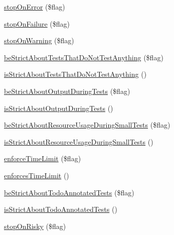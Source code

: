 \begin{DoxyCompactItemize}
\item 
\mbox{\hyperlink{class_p_h_p_unit___framework___test_result_a1c86170306967a8e09ccb686a4b092b7}{stop\+On\+Error}} (\$flag)
\item 
\mbox{\hyperlink{class_p_h_p_unit___framework___test_result_a59807d77af73403915f17d2f2b85a48f}{stop\+On\+Failure}} (\$flag)
\item 
\mbox{\hyperlink{class_p_h_p_unit___framework___test_result_aad8cee0377fe71d1795d141c062f9bfb}{stop\+On\+Warning}} (\$flag)
\item 
\mbox{\hyperlink{class_p_h_p_unit___framework___test_result_aa23c9048516d20d3ffcbacb1751b027e}{be\+Strict\+About\+Tests\+That\+Do\+Not\+Test\+Anything}} (\$flag)
\item 
\mbox{\hyperlink{class_p_h_p_unit___framework___test_result_a3cd7f4d2343876233e7b015f1aaeff27}{is\+Strict\+About\+Tests\+That\+Do\+Not\+Test\+Anything}} ()
\item 
\mbox{\hyperlink{class_p_h_p_unit___framework___test_result_aa667b48eac63113beee3d695707c5afe}{be\+Strict\+About\+Output\+During\+Tests}} (\$flag)
\item 
\mbox{\hyperlink{class_p_h_p_unit___framework___test_result_a4b324407ecad529f074bd663857750bf}{is\+Strict\+About\+Output\+During\+Tests}} ()
\item 
\mbox{\hyperlink{class_p_h_p_unit___framework___test_result_a2305a1e2d9d82b13832b53b56d427e5d}{be\+Strict\+About\+Resource\+Usage\+During\+Small\+Tests}} (\$flag)
\item 
\mbox{\hyperlink{class_p_h_p_unit___framework___test_result_a8da4ef038e603f25f3d734c46fb84702}{is\+Strict\+About\+Resource\+Usage\+During\+Small\+Tests}} ()
\item 
\mbox{\hyperlink{class_p_h_p_unit___framework___test_result_a1faf56bf79696a4bde8a52f900ac565c}{enforce\+Time\+Limit}} (\$flag)
\item 
\mbox{\hyperlink{class_p_h_p_unit___framework___test_result_aa4f9c1661cdc9138cc6d9253000f6af8}{enforces\+Time\+Limit}} ()
\item 
\mbox{\hyperlink{class_p_h_p_unit___framework___test_result_aa81f87a3c4cdb0be1070f3798281f7a0}{be\+Strict\+About\+Todo\+Annotated\+Tests}} (\$flag)
\item 
\mbox{\hyperlink{class_p_h_p_unit___framework___test_result_a30a15e64d3dc5c07cd41faeb2622bd15}{is\+Strict\+About\+Todo\+Annotated\+Tests}} ()
\item 
\mbox{\hyperlink{class_p_h_p_unit___framework___test_result_a347d19d169cbfca7d99d4a7f437b280f}{stop\+On\+Risky}} (\$flag)

\end{DoxyCompactItemize}

